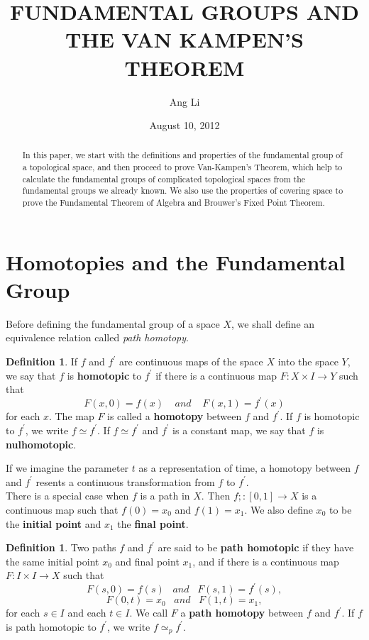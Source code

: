 \documentclass[psamsfonts]{amsart}
\title{FUNDAMENTAL GROUPS AND THE VAN KAMPEN'S THEOREM}
\author{Ang Li}
\date{August 10, 2012}
\theoremstyle{definition}
\newtheorem{defn}[thm]{Definition}
\theoremstyle{remark}
\numberwithin{equation}{section}
\begin{document}
\begin{abstract}

In this paper, we start with the definitions and properties of the fundamental group of a topological space, and then proceed to prove Van-Kampen's Theorem, which help to calculate the fundamental groups of complicated topological spaces from the fundamental groups we already known. We also use the properties of covering space to prove the Fundamental Theorem of Algebra and Brouwer's Fixed Point Theorem.

\end{abstract}

\maketitle

\tableofcontents

\section{Homotopies and the Fundamental Group}

	Before defining the fundamental group of a space $X$, we shall define an equivalence relation called \textit{path homotopy}.
	\begin{defn}
		If $f$ and $f^\prime$ are continuous maps of the space $X$ into the space $Y$, we say that $f$ is \textbf{homotopic} to $f^\prime$ if there is a continuous map $F : X \times I \to Y$ such that
		\begin{equation}
			F(x, 0) = f(x) \;\;\;\; and \;\;\;\;    F(x, 1) = f^\prime(x)
		\end{equation}
		for each $x$. The map $F$ is called a \textbf{homotopy} between $f$ and $f^\prime$. If $f$ is homotopic to $f^\prime$, we write $f \simeq f^\prime$. If $f \simeq f^\prime$ and $f^\prime$ is a constant map, we say that $f$ is \textbf{nulhomotopic}.
	\end{defn}
	
	If we imagine the parameter $t$ as a representation of time, a homotopy between $f$ and $f^\prime$ resents a continuous transformation from $f$ to $f^\prime$.\\
	There is a special case when $f$ is a path in $X$. Then $f;:[0,1] \to X$ is a continuous map such that $f(0)=x_0$ and $f(1)=x_1$. We also define $x_0$ to be the \textbf{initial point} and $x_1$ the \textbf{final point}.
	
	\begin{defn}
		Two paths $f$ and $f^\prime$ are said to be \textbf{path homotopic} if they have the same initial point $x_0$ and final point $x_1$, and if there is a continuous map $F:I \times I \to X$ such that
		\begin{equation}
			F(s,0) = f(s) \;\;\; and \;\;\; F(s,1) = f^\prime(s),
		\end{equation}
		\begin{equation}
			F(0,t) = x_0 \;\;\; and \;\;\; F(1,t) = x_1,
		\end{equation}
		for each $s \in I$ and each $t \in I$. We call $F$ a \textbf{path homotopy} between $f$ and $f^\prime$. If $f$ is path homotopic to $f^\prime$, we write $f \simeq _pf^\prime$.	
	\end{defn}
	
\end{document}
